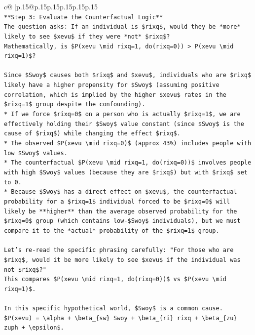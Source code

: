 \documentclass{article}
\begin{document}
{\begin{supertabular}{c@{$\;$}|p{.15\linewidth}@{}p{.15\linewidth}p{.15\linewidth}p{.15\linewidth}p{.15\linewidth}p{.15\linewidth}}
{{{\\ 
\texttt{**Step 3: Evaluate the Counterfactual Logic**} \\
\texttt{The question asks: If an individual is \$rixq\$, would they be *more* likely to see \$xevu\$ if they were *not* \$rixq\$?} \\
\texttt{Mathematically, is \$P(xevu \textbackslash{}mid rixq=1, do(rixq=0)) > P(xevu \textbackslash{}mid rixq=1)\$?} \\
\\ 
\texttt{Since \$Swoy\$ causes both \$rixq\$ and \$xevu\$, individuals who are \$rixq\$ likely have a higher propensity for \$Swoy\$ (assuming positive correlation, which is implied by the higher \$xevu\$ rates in the \$rixq=1\$ group despite the confounding).} \\
\texttt{*   If we force \$rixq=0\$ on a person who is actually \$rixq=1\$, we are effectively holding their \$Swoy\$ value constant (since \$Swoy\$ is the cause of \$rixq\$) while changing the effect \$rixq\$.} \\
\texttt{*   The observed \$P(xevu \textbackslash{}mid rixq=0)\$ (approx 43\%) includes people with low \$Swoy\$ values.} \\
\texttt{*   The counterfactual \$P(xevu \textbackslash{}mid rixq=1, do(rixq=0))\$ involves people with high \$Swoy\$ values (because they are \$rixq\$) but with \$rixq\$ set to 0.} \\
\texttt{*   Because \$Swoy\$ has a direct effect on \$xevu\$, the counterfactual probability for a \$rixq=1\$ individual forced to be \$rixq=0\$ will likely be **higher** than the average observed probability for the \$rixq=0\$ group (which contains low{-}\$Swoy\$ individuals), but we must compare it to the *actual* probability of the \$rixq=1\$ group.} \\
\\ 
\texttt{Let's re{-}read the specific phrasing carefully: "For those who are \$rixq\$, would it be more likely to see \$xevu\$ if the individual was not \$rixq\$?"} \\
\texttt{This compares \$P(xevu \textbackslash{}mid rixq=1, do(rixq=0))\$ vs \$P(xevu \textbackslash{}mid rixq=1)\$.} \\
\\ 
\texttt{In this specific hypothetical world, \$Swoy\$ is a common cause.} \\
\texttt{\$P(xevu) = \textbackslash{}alpha + \textbackslash{}beta\_\{sw\} Swoy + \textbackslash{}beta\_\{ri\} rixq + \textbackslash{}beta\_\{zu\} zuph + \textbackslash{}epsilon\$.} \\
}}}
\end{supertabular}}
\end{document}
